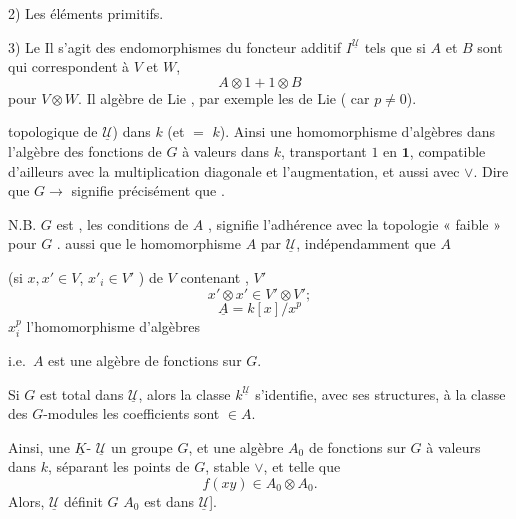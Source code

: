 \documentclass[11pt,a4paper]{article}
\begin{document}
2) \struck{\ill{}} Les éléments primitifs.

3) Le  \ill{} Il s'agit des endomorphismes du
foncteur additif $I^{\underline{\mathcal{U}}}$ tels que si $A$ et $B$ sont
\ill{} qui correspondent à $V$ et $W$, \struck{\ill{}}
\[ A \otimes 1 + 1 \otimes B \]
pour $V \otimes W$. Il \ill{} algèbre de Lie \ill{}, par exemple les \ill{} de
Lie \ill{} (\ill{} car $p \ne 0$).


topologique de $\underline{\mathcal{U}}$) dans $k$ (et $=$ \ill{} $k$). Ainsi
\ill{} une \struck{\ill{}} homomorphisme \ill{} d'algèbres
 dans l'algèbre des fonctions de $G$ à valeurs dans $k$,
transportant $1$ en $\mathbf{1}$, compatible d'ailleurs avec la multiplication
diagonale et l'augmentation, et \ill{} aussi avec $\vee$. Dire que
$G \to$ \ill{} signifie précisément que .

N.B. \ill{} $G$ est \ill{}, \ill{} les conditions de $A$ \ill{}, signifie \ill{}
l'adhérence \ill{} avec la topologie « faible » \ill{} pour \ill{} $G$ \ill{}.
\ill{} aussi que le \ill{} homomorphisme \ill{} $A$ \ill{} par
$\underline{\mathcal{U}}$, \struck{\ill{}} \ill{} indépendamment \ill{} que $A$
\ill{}

\ill{} (si $x, x' \in V$, $x'_i \in V'$ \ill{}) \ill{} de $V$ contenant \ill{},
\ill{} $V'$ \ill{}
\[ x' \otimes x' \in V' \otimes V' ; \]
 \ill{}
\[ \underline{A} = k[x]/x^{p} \]
\struck{\ill{}} \ill{} $x_i^{p}$ \ill{} l'homomorphisme d'algèbres \ill{}


\struck{\ill{}} i.e.\ $A$ est une algèbre de fonctions sur $G$.

Si $G$ est total dans $\underline{\mathcal{U}}$, alors la classe
$k^{\underline{\mathcal{U}}}$ s'identifie, avec  ses structures,
à la classe des \struck{\ill{}} $G$-modules  les \ill{}
coefficients sont \struck{\ill{}} \ill{} $\in A$.

Ainsi, une $\underline{K}$- $\underline{\mathcal{U}}$
\ill{} un \struck{\ill{}} groupe $G$, et une \struck{\ill{}} algèbre $A_{0}$ de
fonctions sur $G$ à valeurs dans $k$, séparant les points de $G$, \ill{} stable
\ill{} $\vee$, et telle que
\[ f(xy) \in A_{0} \otimes A_{0} . \]
Alors, $\underline{\mathcal{U}}$ \ill{} définit \ill{} $G$ \ill{} $A_{0}$ est
\struck{\ill{}} \ill{} dans $\underline{\mathcal{U}}$].
\end{document}
